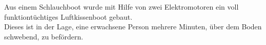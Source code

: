 Aus einem Schlauchboot wurde mit Hilfe von zwei Elektromotoren ein voll funktiontüchtiges Luftkissenboot gebaut. \\
Dieses ist in der Lage, eine erwachsene Person mehrere Minuten, über dem Boden schwebend, zu befördern. \\
